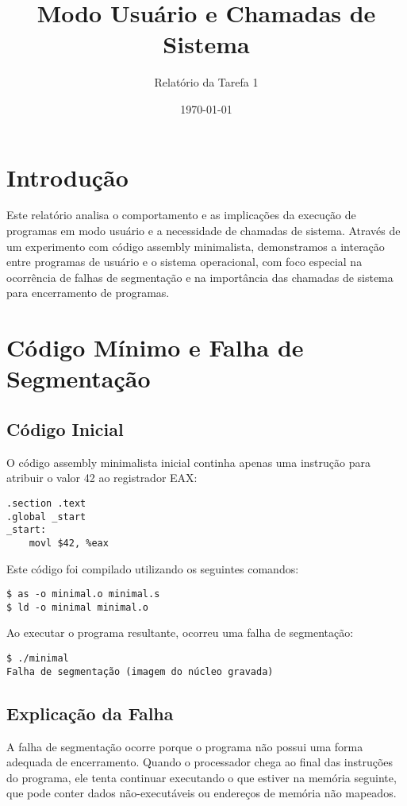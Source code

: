 \documentclass[12pt,a4paper]{article}
\title{Modo Usuário e Chamadas de Sistema}
\author{Relatório da Tarefa 1}
\date{\today}
\begin{document}
\maketitle

\section{Introdução}

Este relatório analisa o comportamento e as implicações da execução de programas em modo usuário e a necessidade de chamadas de sistema. Através de um experimento com código assembly minimalista, demonstramos a interação entre programas de usuário e o sistema operacional, com foco especial na ocorrência de falhas de segmentação e na importância das chamadas de sistema para encerramento de programas.

\section{Código Mínimo e Falha de Segmentação}

\subsection{Código Inicial}

O código assembly minimalista inicial continha apenas uma instrução para atribuir o valor 42 ao registrador EAX:

\begin{verbatim}
.section .text
.global _start
_start:
    movl $42, %eax
\end{verbatim}

Este código foi compilado utilizando os seguintes comandos:

\begin{verbatim}
$ as -o minimal.o minimal.s
$ ld -o minimal minimal.o
\end{verbatim}

Ao executar o programa resultante, ocorreu uma falha de segmentação:

\begin{verbatim}
$ ./minimal
Falha de segmentação (imagem do núcleo gravada)
\end{verbatim}

\subsection{Explicação da Falha}

A falha de segmentação ocorre porque o programa não possui uma forma adequada de encerramento. Quando o processador chega ao final das instruções do programa, ele tenta continuar executando o que estiver na memória seguinte, que pode conter dados não-executáveis ou endereços de memória não mapeados.
\end{document}
